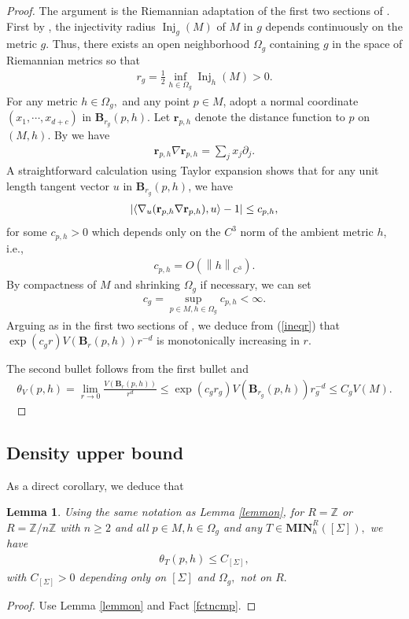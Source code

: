 \documentclass[11pt,a4paper]{amsart}
\numberwithin{equation}{section}
\newcommand{\inj}{\operatorname{Inj}}
\newcommand{\mn}{\mathbf{MIN}}
\newcommand{\Om}{\Omega}
\newcommand{\Si}{\Sigma}
\newcommand{\ta}{\theta}
\newcommand{\cd}{\cdots}
\newcommand{\la}{\langle}
\newcommand{\ra}{\rangle}
\newcommand{\no}[1]{\left\lVert#1\right\rVert}
\DeclarePairedDelimiter{\ri}{\la}{\ra}
\newcommand{\br}{\mathbf{B}_r}
\newcommand{\pd}{\partial}
\newcommand{\na}{\nabla}
\newcommand{\Z}{\mathbb{Z}}
\theoremstyle{plain}
\newtheorem{lem}{Lemma}[subsection]
\theoremstyle{definition}
\numberwithin{equation}{subsection}
\begin{document}
\begin{proof}
	The argument is the Riemannian adaptation of the first two sections of \cite{Dar}. First by \cite[Section 8 Theorem]{PEcir}, the injectivity radius $\inj_g(M)$ of $M$ in $g$ depends continuously on the metric $g$. Thus, there exists an open neighborhood $\Om_g$ containing $g$ in the space of Riemannian metrics so that 
	\begin{align*}
		r_g=\frac{1}{2}\inf_{h\in \Om_g}\inj_{h}(M)>0.
	\end{align*}	
	For any metric $h\in\Om_g,$ and any point $p\in M$, adopt a normal coordinate $(x_1,\cd,x_{d+c})$ in $\mathbf{B}_{r_g}(p,h)$. Let $\mathbf{r}_{p,h}$ denote the distance function to $p$ on $(M,h)$. By \cite[Chapter 2 ]{AG} we have 
	\begin{align}\label{rreq}
		\mathbf{r}_{p,h}\na \mathbf{r}_{p,h}=\sum_j x_j\pd_j.
	\end{align}
	A straightforward calculation using Taylor expansion shows that for any unit length tangent vector $u$ in $\mathbf{B}_{r_g}(p,h)$, we have
	\begin{align}\label{ineqr}
		|\ri{\na_u(\mathbf{r}_{p,h}\na \mathbf{r}_{p,h}),u}-1|\le c_{p,h},
	\end{align}for some $c_{p,h}>0$ which depends only on the $C^3$ norm of the ambient metric $h$, i.e.,
	\begin{align}\label{cnorm}
		c_{p,h}=O(\no{h}_{C^3}).
	\end{align}
	By compactness of $M$ and shrinking $\Om_g$ if necessary, we can set
	\begin{align*}
		c_g=\sup_{p\in M,h\in\Om_g}c_{p,h}<\infty.
	\end{align*}	
	Arguing as in the first two sections of \cite{Dar}, we deduce from (\ref{ineqr}) that $\exp(c_gr)V(\br(p,h))r^{-d}$ is monotonically increasing in $r$.
	
	The second bullet follows from the first bullet and \begin{align}
		\ta_V({p,h})=\lim_{r\to 0}\frac{V(\br(p,h))}{r^d}\le \exp(c_gr_g)V(\mathbf{B}_{r_g}(p,h))r_g^{-d}\le C_gV(M).
	\end{align}   
\end{proof}
\subsection{Density upper bound}
As a direct corollary, we deduce that
\begin{lem}\label{lemdst}
	Using the same notation as Lemma \ref{lemmon}, for $R=\Z$ or $R=\Z/n\Z$ with $n\ge 2$ and all $p\in M,h\in\Om_g$ and any $T\in\mn_h^{R}\left([\Si]\right),$ we have
	\begin{align*}
		\ta_T(p,h)\le C_{[\Si]},
	\end{align*}with $C_{[\Si]}>0$ depending only on $[\Si]$ and $\Om_g,$ not on $R.$
\end{lem}
\begin{proof}
	Use Lemma \ref{lemmon} and Fact \ref{fctncmp}.
\end{proof}
\end{document}
